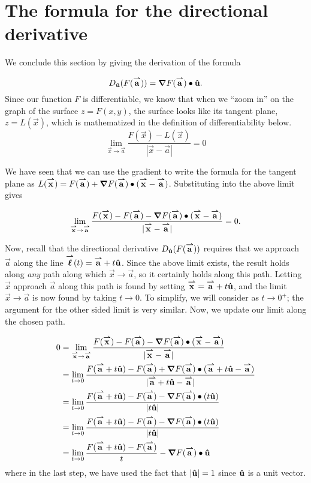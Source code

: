 \documentclass{ximera}
\begin{document}
%
%

\section{The formula for the directional derivative}

We conclude this section by giving the derivation of the formula

\[
D_{\uvec{u}}(F(\vec{a}))=\grad{F}(\vec{a})\dotp\uvec{u}.
\]
Since our function $F$ is differentiable, we know that when we ``zoom
in'' on the graph of the surface $z=F(x,y)$, the surface looks like
its tangent plane, $z=L(\vec{x})$, which is mathematized in the
definition of differentiability below.
\[
\lim_{\vec{x} \to \vec{a} }
\frac{F(\vec{x})-L(\vec{x})}{|\vec{x}-\vec{a}|} = 0
\]

We have seen that we can use the gradient to write the formula for the
tangent plane as $L(\vec{x}) = F(\vec{a}) + \grad{F}(\vec{a}) \dotp
(\vec{x}-\vec{a})$.  Substituting into the above limit gives

\[
\lim_{\vec{x} \to \vec{a} } \frac{F(\vec{x})-F(\vec{a}) - \grad{F}(\vec{a}) \dotp (\vec{x}-\vec{a})}{|\vec{x}-\vec{a}|}=0 .
\]

Now, recall that the directional derivative $D_{\uvec{u}}(F(\vec{a}))$
requires that we approach $\vec{a}$ along the line $\vecl(t) =
\vec{a}+t\uvec{u}$.  Since the above limit exists, the result holds
along \emph{any} path along which $\vec{x} \to \vec{a}$, so it
certainly holds along this path.  Letting $\vec{x}$ approach $\vec{a}$
along this path is found by setting $\vec{x} = \vec{a}+t\uvec{u}$, and
the limit $\vec{x} \to \vec{a}$ is now found by taking $t \to 0$.  To
simplify, we will consider as $t \to 0^+$; the argument for the other
sided limit is very similar.  Now, we update our limit along the
chosen path.

\begin{align*}
0 & =\lim_{\vec{x} \to \vec{a} } \frac{F(\vec{x})-F(\vec{a}) - \grad{F}(\vec{a}) \dotp (\vec{x}-\vec{a})}{|\vec{x}-\vec{a}|} \\
&= \lim_{t \to 0} \frac{F( \vec{a}+t\uvec{u})-F(\vec{a}) + \grad{F}(\vec{a}) \dotp ( \vec{a}+t\uvec{u}-\vec{a})}{| \vec{a}+t\uvec{u}-\vec{a}|}\\
&= \lim_{t \to 0} \frac{F( \vec{a}+t\uvec{u})-F(\vec{a}) - \grad{F}(\vec{a}) \dotp (t\uvec{u})}{| t\uvec{u}|} \\
&= \lim_{t \to 0} \frac{F( \vec{a}+t\uvec{u})-F(\vec{a}) - \grad{F}(\vec{a}) \dotp (t\uvec{u})}{| t\uvec{u}|}\\
&= \lim_{t \to 0} \frac{F( \vec{a}+t\uvec{u})-F(\vec{a})}{t} - \grad{F}(\vec{a}) \dotp \uvec{u}\\
\end{align*}
where in the last step, we have used the fact that $|\uvec{u}|=1$ since $\uvec{u}$ is a unit vector.
\end{document}
